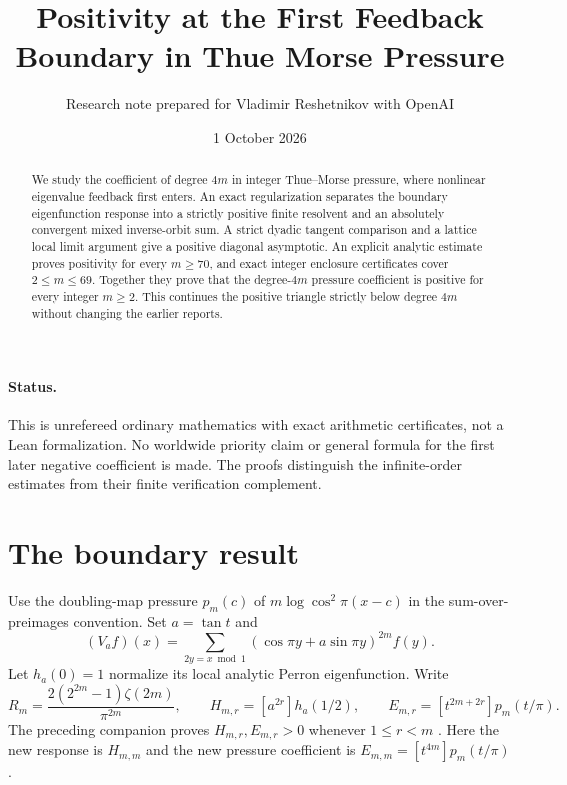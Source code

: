 \documentclass[11pt,a4paper]{article}
\title{Positivity at the First Feedback Boundary in Thue Morse Pressure}
\author{Research note prepared for Vladimir Reshetnikov with OpenAI}\date{1 October 2026}
\theoremstyle{remark}\newtheorem*{ednote}{Editorial note (ProveIt, 2026-10-01)}
\begin{document}
\maketitle
\begin{abstract}
We study the coefficient of degree $4m$ in integer Thue--Morse pressure, where nonlinear eigenvalue feedback first enters. An exact regularization separates the boundary eigenfunction response into a strictly positive finite resolvent and an absolutely convergent mixed inverse-orbit sum. A strict dyadic tangent comparison and a lattice local limit argument give a positive diagonal asymptotic. An explicit analytic estimate proves positivity for every $m\ge70$, and exact integer enclosure certificates cover $2\le m\le69$. Together they prove that the degree-$4m$ pressure coefficient is positive for every integer $m\ge2$. This continues the positive triangle strictly below degree $4m$ without changing the earlier reports.
\end{abstract}
\paragraph{Status.}
This is unrefereed ordinary mathematics with exact arithmetic certificates, not a Lean formalization. No worldwide priority claim or general formula for the first later negative coefficient is made. The proofs distinguish the infinite-order estimates from their finite verification complement.

\section{The boundary result}
Use the doubling-map pressure $p_m(c)$ of $m\log\cos^2\!\pi(x-c)$ in the sum-over-preimages convention. Set $a=\tan t$ and
\[
 (V_af)(x)=\sum_{2y=x\bmod1}(\cos\pi y+a\sin\pi y)^{2m}f(y).
\]
Let $h_a(0)=1$ normalize its local analytic Perron eigenfunction. Write
\[
 R_m=\frac{2(2^{2m}-1)\zeta(2m)}{\pi^{2m}},\qquad
 H_{m,r}=[a^{2r}]h_a(1/2),\qquad E_{m,r}=[t^{2m+2r}]p_m(t/\pi).
\]
The preceding companion proves $H_{m,r},E_{m,r}>0$ whenever $1\le r<m$ \cite{triangle}. Here the new response is $H_{m,m}$ and the new pressure coefficient is $E_{m,m}=[t^{4m}]p_m(t/\pi)$.
\end{document}

